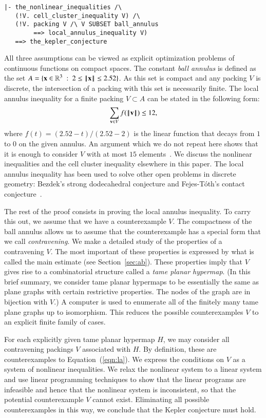 
\begin{verbatim}
|- the_nonlinear_inequalities /\ 
   (!V. cell_cluster_inequality V) /\
   (!V. packing V /\ V SUBSET ball_annulus 
        ==> local_annulus_inequality V) 
   ==> the_kepler_conjecture
\end{verbatim}
All three assumptions can be viewed as explicit optimization problems
of continuous functions on compact spaces.
The constant {\it ball annulus} is defined as the set
$A=\{{\bf x}\in\mathbb{R}^3 \ :\  2\le {\hbox{\ensuremath{\hspace{0.1em}|\hspace{-0.1em}|\hspace{0.1em}}}{\bf x}\hbox{\ensuremath{\hspace{0.1em}|\hspace{-0.1em}|\hspace{0.1em}}}} \le 2.52\}$.  As this set is
compact and any packing $V$ is discrete, the intersection of a packing
with this set is necessarily finite.   The local annulus inequality for a finite
packing $V\subset A$ can be stated in the following form:
\begin{equation}\label{eqn:la}
\sum_{{\mathbf v}\in V} f({\hbox{\ensuremath{\hspace{0.1em}|\hspace{-0.1em}|\hspace{0.1em}}}{\mathbf v}\hbox{\ensuremath{\hspace{0.1em}|\hspace{-0.1em}|\hspace{0.1em}}}})  \le 12,
\end{equation}
where $f(t) = (2.52-t)/(2.52-2)$ is the linear function that decays
from $1$ to $0$ on the given annulus.  An argument which we do not
repeat here shows that it is enough to consider $V$ with at most $15$
elements~\cite[Lemma~6.110]{DSP}.  We discuss the nonlinear
inequalities and the cell cluster inequality elsewhere in this paper.
The local annulus inequality has been used to solve other open
problems in discrete geometry: Bezdek's strong dodecahedral conjecture
and Fejes-T\'oth's contact conjecture~\cite{hales2011strong}.

The rest of the proof consists in proving the local annulus
inequality.  To carry this out, we assume that we have a
counterexample $V$.  The compactness of the ball annulus allows us to
assume that the counterexample has a special form that we call {\it
  contravening}.  We make a detailed study of the properties of a
contravening $V$.  The most important of these properties is expressed
by what is called the main estimate (see Section~\ref{sec:ab}).  These
properties imply that $V$ gives rise to a combinatorial structure
called a {\it tame planar hypermap}.  (In this brief summary, we
consider tame planar hypermaps to be essentially the same as plane
graphs with certain restrictive properties.  The nodes of the graph
are in bijection with $V$.)  A computer is used to enumerate all of
the finitely many tame plane graphs up to isomorphism.  This reduces
the possible counterexamples $V$ to an explicit finite family of
cases.

For each explicitly given tame planar hypermap $H$, we may consider
all contravening packings $V$ associated with $H$.  By definition,
these are counterexamples to Equation~(\ref{eqn:la}).  We express the
conditions on $V$ as a system of nonlinear inequalities.  We relax the
nonlinear system to a linear system and use linear programming
techniques to show that the linear programs are infeasible and hence
that the nonlinear system is inconsistent, so that the potential
counterexample $V$ cannot exist.  Eliminating all possible
counterexamples in this way, we conclude that the Kepler conjecture
must hold.

